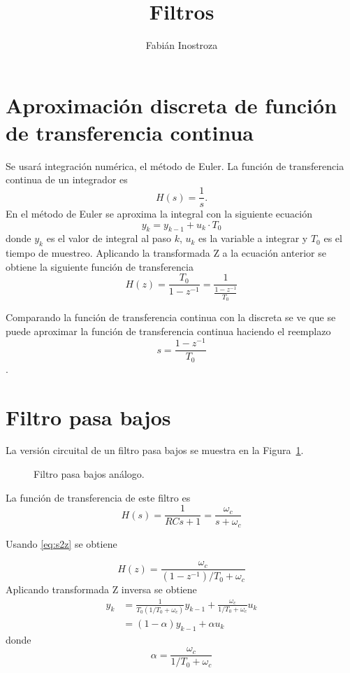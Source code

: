 \documentclass[11pt]{article} %
\title{Filtros}
\author{Fabián Inostroza}
\begin{document}
\maketitle

\section{Aproximación discreta de función de transferencia continua}
Se usará integración numérica, el método de Euler.
La función de transferencia continua de un integrador es
\[ H(s) = \frac{1}{s}. \]
En el método de Euler se aproxima la integral con la siguiente 
ecuación
\[ y_k = y_{k-1}+ u_k\cdot T_0 \]
donde \( y_k \) es el valor de integral al paso \( k \),
\( u_k \) es la variable a integrar y \( T_0 \) es el 
tiempo de muestreo. Aplicando la transformada Z a la ecuación 
anterior se obtiene la siguiente función de transferencia
\[ H(z) = \frac{T_0}{1-z^{-1}} = \frac{1}{ \frac{1-z^{-1}}{T_0} } \]

Comparando la función de transferencia continua con la 
discreta se ve que se puede aproximar la función de 
 transferencia continua haciendo el reemplazo 
\begin{equation}
s = \frac{1-z^{-1}}{T_0} \label{eq:s2z}
\end{equation}.
 
\section{Filtro pasa bajos}
La versión circuital de un filtro pasa bajos se muestra en la Figura~\ref{fig:LPF}.

\begin{figure}[h!tb]
\centering

\caption{Filtro pasa bajos análogo.}
\label{fig:LPF}
\end{figure}

La función de transferencia de este filtro es
\[ H(s) = \frac{1}{RCs+1} = \frac{\omega_c}{s+\omega_c} \]

Usando \eqref{eq:s2z} se obtiene

\[ H(z) = \frac{\omega_c}{(1-z^{-1})/T_0 + \omega_c} \]
Aplicando transformada Z inversa se obtiene
\begin{align*}
y_k &= \frac{1}{T_0 (1/T_0+\omega_c)
} y_{k-1} + \frac{\omega_c}{1/T_0+\omega_c} u_k  \\
	&= (1-\alpha)y_{k-1} + \alpha u_k
\end{align*}
donde
\[ \alpha = \frac{\omega_c}{1/T_0+\omega_c} \]
\end{document}
